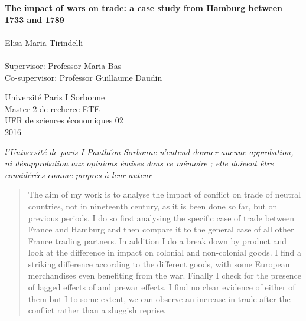 \documentclass[12pt,a4paper,titlepage]{article}
\begin{document}
\begin{titlepage}
\begin{center}
\vspace*{1cm}
 
      \vspace{0.5cm}
		\Large     
         \textbf{The impact of wars on trade: a case study from Hamburg between 1733 and 1789}\\~\\
        \vspace{2cm}
        {Elisa Maria Tirindelli}\\~\\
        {Supervisor: Professor Maria Bas}\\
        {Co-supervisor: Professor Guillaume Daudin}
        
        \vfill
        
        Université Paris I Sorbonne\\
        Master 2 de recherce ETE \\
        UFR de sciences économiques 02\\
        2016
        
\end{center}
\end{titlepage}
\begin{center}
\vspace*{\fill}
 \textit{l'Université de paris I Panthéon Sorbonne n'entend donner aucune approbation,
ni désapprobation aux opinions émises dans ce mémoire ; elle doivent être considérées comme propres à leur auteur}
\vspace{\fill}
\end{center}
\newpage

\begin{abstract}
The aim of my work is to analyse the impact of conflict on trade of neutral countries, not in nineteenth century, as it is been done so far, but on previous periods. I do so first analysing the specific case of trade between France and Hamburg and then compare it to the general case of all other France trading partners. In addition I do a break down by product and look at the difference in impact on colonial and non-colonial goods. I find a striking difference according to the different goods, with some European merchandises even benefiting from the war. Finally I check for the presence of lagged effects of and prewar effects. I find no clear evidence of either of them but I to some extent, we can observe an increase in trade after the conflict rather than a sluggish reprise. 
\end{abstract}
\end{document}
